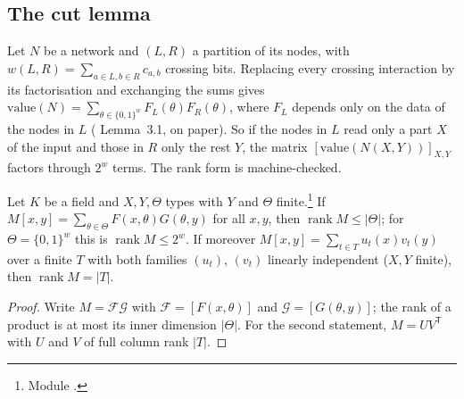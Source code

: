 \documentclass[10pt]{amsart}
\theoremstyle{plain}
\theoremstyle{definition}
\theoremstyle{remark}
\numberwithin{equation}{section}
\newcommand{\rk}{\operatorname{rank}}
\begin{document}
\subsection{The cut lemma}\label{sec:cut}
Let $N$ be a network and $(L,R)$ a partition of its nodes, with $w(L,R)=\sum_{a\in L,b\in R}c_{a,b}$
crossing bits. Replacing every crossing interaction by its factorisation and exchanging the sums gives
$\mathrm{value}(N)=\sum_{\theta\in\{0,1\}^{w}}F_L(\theta)F_R(\theta)$, where $F_L$ depends only on the
data of the nodes in $L$ ( Lemma~3.1, on paper). So if the nodes in $L$ read only a
part $X$ of the input and those in $R$ only the rest $Y$, the matrix $[\mathrm{value}(N(X,Y))]_{X,Y}$
factors through $2^w$ terms. The rank form is machine-checked.

\begin{theorem}\label{thm:cut}
Let $K$ be a field and $X,Y,\Theta$ types with $Y$ and $\Theta$ finite.\footnote{Module
.} If $M[x,y]=\sum_{\theta\in\Theta}F(x,\theta)G(\theta,y)$
for all $x,y$, then $\rk M\le|\Theta|$; for $\Theta=\{0,1\}^w$ this is $\rk M\le2^w$. If moreover
$M[x,y]=\sum_{t\in T}u_t(x)v_t(y)$ over a finite $T$ with both families $(u_t)$, $(v_t)$ linearly
independent ($X,Y$ finite), then $\rk M=|T|$.
\end{theorem}
\begin{proof}
Write $M=\mathcal F\mathcal G$ with $\mathcal F=[F(x,\theta)]$ and $\mathcal G=[G(\theta,y)]$; the rank of a
product is at most its inner dimension $|\Theta|$. For the second statement, $M=UV^{\mathsf T}$ with $U$
and $V$ of full column rank $|T|$.
\end{proof}
\end{document}
